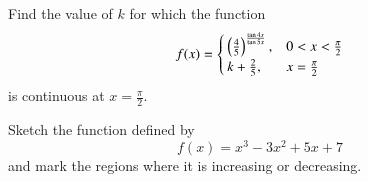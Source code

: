 \documentclass[journal,12pt,twocolumn]{IEEEtran}
\begin{document}
%
%
%
\begin{problem}
Find the value of $k$ for which the function
\begin{equation}
f(x) = 
\begin{cases}
\left(\frac{4}{5}\right)^{\frac{\tan 4x}{\tan 5x}}, & 0 < x < \frac{\pi}{2}
\\
k + \frac{2}{5}, & x = \frac{\pi}{2}
\end{cases}
\end{equation}
is continuous at $x = \frac{\pi}{2}$.
\end{problem}
%
%
%
\begin{problem}
Sketch the function defined by
%
\begin{equation}
f(x) = x^3 - 3x^2+5x+7
\end{equation}
%
and mark the regions where it is increasing or decreasing.
\end{problem}
%
%
%
\end{document}
